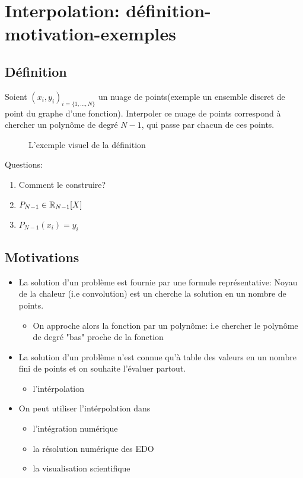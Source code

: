 \section{Interpolation: définition-motivation-exemples}
\subsection{Définition}
\begin{definition}
    Soient $(x_i, y_i)_{i = \{1, \ldots, N\}}$ un nuage de points(exemple un ensemble discret de point du graphe d'une fonction). Interpoler ce nuage de points correspond à chercher un polynôme de degré $N-1$, qui passe par chacun de ces points.
\end{definition}
\begin{figure}[H]
    \centering
    \caption{L'exemple visuel de la définition}
    \label{fig:definition-example}
\end{figure}
Questions:
\begin{enumerate}
    \item Comment le construire?
    \item $P_{N-1} \in \mathbb{R}_{N-1}[X]$
    \item $P_{N-1}(x_i) = y_i$
\end{enumerate}

\subsection{Motivations}
\begin{itemize}
    \item La solution d'un problème est fournie par une formule représentative: Noyau de la chaleur (i.e convolution) est un cherche la solution en un nombre de points.
    \begin{itemize}
        \item On approche alors la fonction par un polynôme: i.e chercher le polynôme de degré "bas" proche de la fonction
    \end{itemize}
    \item La solution d'un problème n'est connue qu'à table des valeurs en un nombre fini de points et on souhaite l'évaluer partout.
        \begin{itemize}
            \item l'intérpolation
        \end{itemize}
    \item On peut utiliser l'intérpolation dans 
        \begin{itemize}
            \item l'intégration numérique
            \item la résolution numérique des EDO
            \item la visualisation scientifique
        \end{itemize}
\end{itemize}

